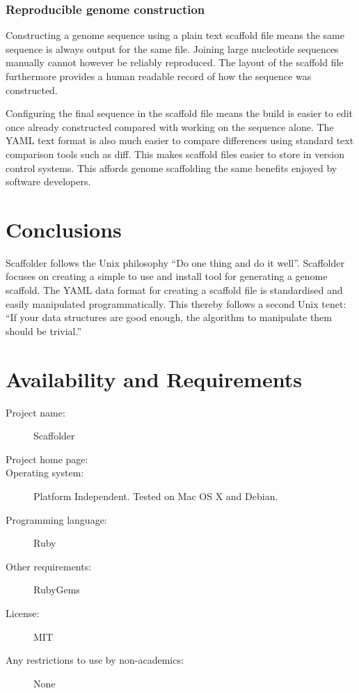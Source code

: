 \documentclass[10pt]{bmc_article}
\newenvironment{bmcformat}{\begin{raggedright}\baselineskip20pt\sloppy\setboolean{publ}{false}}{\end{raggedright}\baselineskip20pt\sloppy}
\begin{document}
\begin{bmcformat}
\subsubsection{Reproducible genome construction}

Constructing a genome sequence using a plain text scaffold file means the same
sequence is always output for the same file. Joining large nucleotide
sequences manually cannot however be reliably reproduced. The layout of the
scaffold file furthermore provides a human readable record of how the sequence
was constructed. \pb

Configuring the final sequence in the scaffold file means the build is easier
to edit once already constructed compared with working on the sequence alone.
The YAML text format is also much easier to compare differences using standard
text comparison tools such as diff. This makes scaffold files easier to store
in version control systems. This affords genome scaffolding the same benefits
enjoyed by software developers. \pb

\section*{Conclusions} %

Scaffolder follows the Unix philosophy ``Do one thing and do it well''.
Scaffolder focuses on creating a simple to use and install tool for generating
a genome scaffold. The YAML data format for creating a scaffold file is
standardised and easily manipulated programmatically. This thereby follows
a second Unix tenet: ``If your data structures are good enough, the algorithm
to manipulate them should be trivial.''

\section*{Availability and Requirements} %

  \begin{description}
    \item[Project name:] Scaffolder
    \item[Project home page:] \scaffolder
    \item[Operating system:] Platform Independent. Tested on Mac OS X and
    Debian.
    \item[Programming language:] Ruby
    \item[Other requirements:] RubyGems
    \item[License:] MIT
    \item[Any restrictions to use by non-academics:] None
  \end{description}


\end{bmcformat}
\end{document}
